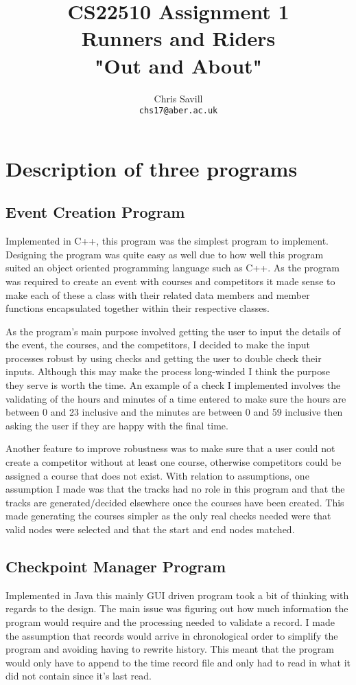 \documentclass[a4paper,12pt]{article}
\title{CS22510 Assignment 1\\
Runners and Riders\\
"Out and About"}
\author{Chris Savill\\\texttt{chs17@aber.ac.uk}}
\begin{document}
\maketitle
\newpage
\tableofcontents
\newpage

\section{Description of three programs}

\subsection{Event Creation Program}
\noindent Implemented in C++, this program was the simplest program to implement. Designing the program was quite easy as well due to how well this program suited an object oriented programming language such as C++. As the program was required to create an event with courses and competitors it made sense to make each of these a class with their related data members and member functions encapsulated together within their respective classes.

\vspace{5mm}
\noindent As the program's main purpose involved getting the user to input the details of the event, the courses, and the competitors, I decided to make the input processes robust by using checks and getting the user to double check their inputs. Although this may make the process long-winded I think the purpose they serve is worth the time. An example of a check I implemented involves the validating of the hours and minutes of a time entered to make sure the hours are between 0 and 23 inclusive and the minutes are between 0 and 59 inclusive then asking the user if they are happy with the final time.

\vspace{5mm}
\noindent Another feature to improve robustness was to make sure that a user could not create a competitor without at least one course, otherwise competitors could be assigned a course that does not exist. With relation to assumptions, one assumption I made was that the tracks had no role in this program and that the tracks are generated/decided elsewhere once the courses have been created. This made generating the courses simpler as the only real checks needed were that valid nodes were selected and that the start and end nodes matched.

\subsection{Checkpoint Manager Program}
\noindent Implemented in Java this mainly GUI driven program took a bit of thinking with regards to the design. The main issue was figuring out how much information the program would require and the processing needed to validate a record. I made the assumption that records would arrive in chronological order to simplify the program and avoiding having to rewrite history. This meant that the program would only have to append to the time record file and only had to read in what it did not contain since it's last read.
\end{document}
